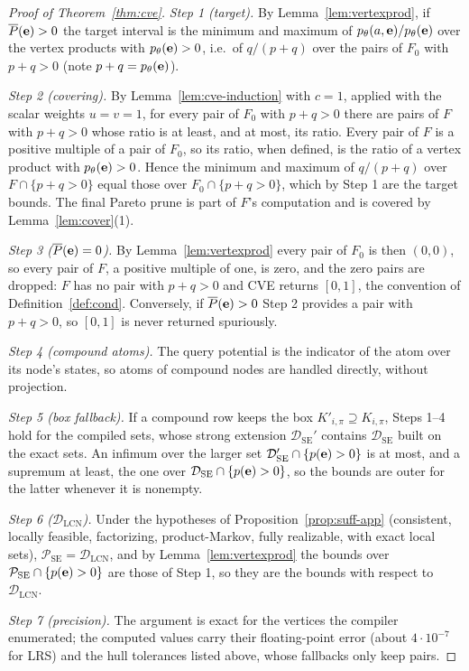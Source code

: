 \documentclass{article} %
\newcommand{\DSE}{\mathcal{D}_{\mathrm{SE}}}
\newcommand{\DLCN}{\mathcal{D}_{\mathrm{LCN}}}
\begin{document}
\begin{proof}[Proof of Theorem~\ref{thm:cve}]
\emph{Step 1 (target).} By Lemma~\ref{lem:vertexprod}, if $\overline P(\mathbf{e})>0$ the target
interval is the minimum and maximum of $p_\theta(a,\mathbf{e})/p_\theta(\mathbf{e})$ over the vertex
products with $p_\theta(\mathbf{e})>0$, i.e.\ of $q/(p+q)$ over the pairs of $F_0$ with $p+q>0$
(note $p+q=p_\theta(\mathbf{e})$).

\emph{Step 2 (covering).} By Lemma~\ref{lem:cve-induction} with $c=1$, applied with the
scalar weights $u=v=1$, for every pair of $F_0$ with $p+q>0$ there are pairs of $F$ with
$p+q>0$ whose ratio is at least, and at most, its ratio. Every pair of $F$ is a positive
multiple of a pair of $F_0$, so its ratio, when defined, is the ratio of a vertex product
with $p_\theta(\mathbf{e})>0$. Hence the minimum and maximum of $q/(p+q)$ over $F\cap\{p+q>0\}$
equal those over $F_0\cap\{p+q>0\}$, which by Step 1 are the target bounds. The final
Pareto prune is part of $F$'s computation and is covered by Lemma~\ref{lem:cover}(1).

\emph{Step 3 ($\overline P(\mathbf{e})=0$).} By Lemma~\ref{lem:vertexprod} every pair of $F_0$ is
then $(0,0)$, so every pair of $F$, a positive multiple of one, is zero, and the zero pairs
are dropped: $F$ has no pair with $p+q>0$ and CVE returns $[0,1]$, the convention of
Definition~\ref{def:cond}. Conversely, if $\overline P(\mathbf{e})>0$ Step 2 provides a pair with
$p+q>0$, so $[0,1]$ is never returned spuriously.

\emph{Step 4 (compound atoms).} The query potential is the indicator of the atom over its
node's states, so atoms of compound nodes are handled directly, without projection.

\emph{Step 5 (box fallback).} If a compound row keeps the box $K'_{i,\pi}\supseteq
K_{i,\pi}$, Steps 1--4 hold for the compiled sets, whose strong extension $\DSE'$ contains
$\DSE$ built on the exact sets. An infimum over the larger set
$\DSE'\cap\{p(\be)>0\}$ is at most, and a supremum at least, the one over
$\DSE\cap\{p(\be)>0\}$, so the bounds are outer for the latter whenever it is nonempty.

\emph{Step 6 ($\DLCN$).} Under the hypotheses of Proposition~\ref{prop:suff-app} (consistent,
locally feasible, factorizing, product-Markov, fully realizable, with exact local sets),
$\mathcal P_{\mathrm{SE}}=\DLCN$, and by Lemma~\ref{lem:vertexprod} the bounds over
$\mathcal P_{\mathrm{SE}}\cap\{p(\mathbf{e})>0\}$ are those of Step 1, so they are the bounds with
respect to $\DLCN$.

\emph{Step 7 (precision).} The argument is exact for the vertices the compiler enumerated;
the computed values carry their floating-point error (about $4\cdot10^{-7}$ for LRS) and the
hull tolerances listed above, whose fallbacks only keep pairs.
\end{proof}
\end{document}
